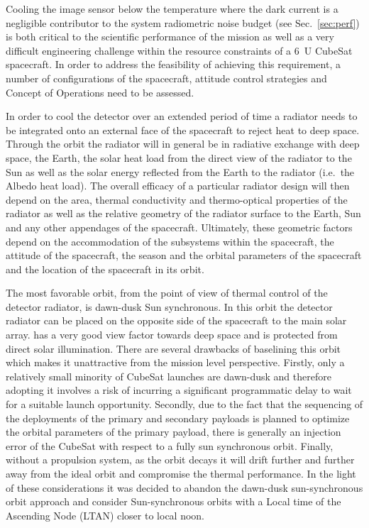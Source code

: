 \documentclass[]{iac}
\begin{document}
Cooling the image sensor below the temperature where the dark current is a negligible contributor to the system
radiometric noise budget (see Sec.~\ref{sec:perf}) is both critical to the scientific performance of the mission as well
as a very difficult engineering challenge within the resource constraints of a \SI{6}{U} CubeSat spacecraft. In order to
address the feasibility of achieving this requirement, a number of configurations of the spacecraft, attitude control
strategies and Concept of Operations need to be assessed.

In order to cool the detector over an extended period of time a radiator needs to be integrated onto an external face of
the spacecraft to reject heat to deep space. Through the orbit the radiator will in general be in radiative exchange
with deep space, the Earth, the solar heat load from the direct view of the radiator to the Sun as well as the solar
energy reflected from the Earth to the radiator (i.e.\ the Albedo heat load). The overall efficacy of a particular
radiator design will then depend on the area, thermal conductivity and thermo-optical properties of the radiator as well
as the relative geometry of the radiator surface to the Earth, Sun and any other appendages of the spacecraft.
Ultimately, these geometric factors depend on the accommodation of the subsystems within the spacecraft, the attitude of
the spacecraft, the season and the orbital parameters of the spacecraft and the location of the spacecraft in its orbit.

The most favorable orbit, from the point of view of thermal control of the detector radiator, is dawn-dusk Sun
synchronous. In this orbit the detector radiator can be placed on the opposite side of the spacecraft to the main solar
array. has a very good view factor towards deep space and is protected from direct solar illumination. There are several
drawbacks of baselining this orbit which makes it unattractive from the mission level perspective. Firstly, only a
relatively small minority of CubeSat launches are dawn-dusk and therefore adopting it involves a risk of incurring a
significant programmatic delay to wait for a suitable launch opportunity. Secondly, due to the fact that the sequencing
of the deployments of the primary and secondary payloads is planned to optimize the orbital parameters of the primary
payload, there is generally an injection error of the CubeSat with respect to a fully sun synchronous orbit. Finally,
without a propulsion system, as the orbit decays it will drift further and further away from the ideal orbit and
compromise the thermal performance. In the light of these considerations it was decided to abandon the dawn-dusk
sun-synchronous orbit approach and consider Sun-synchronous orbits with a Local time of the Ascending Node (LTAN) closer
to local noon.
\end{document}
